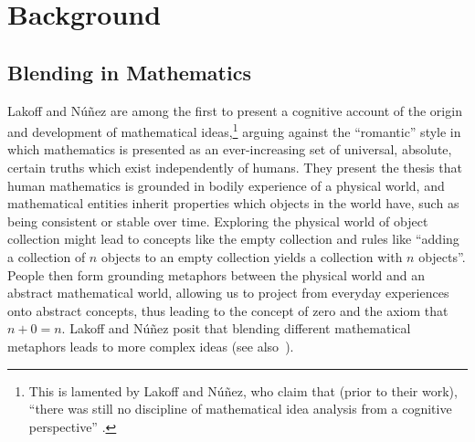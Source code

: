 \section{Background}
\label{sec:background}

\subsection{Blending in Mathematics}
\label{subsec:mathblend}


Lakoff and N{\'u}{\~n}ez \citep{Lak00} are among the first to present
a cognitive account of the origin and development of mathematical
ideas,\footnote{This is lamented by Lakoff and N{\'u}{\~n}ez, who
claim that (prior to their work), ``there was still no discipline of
mathematical idea analysis from a cognitive perspective''
\citep{Lak00}.} arguing against the ``romantic'' style in which
mathematics is presented as an ever-increasing set of universal,
absolute, certain truths which exist independently of humans. They
present the thesis that human mathematics is grounded in bodily
experience of a physical world, and mathematical entities inherit
properties which objects in the world have, such as being consistent
or stable over time.  Exploring the physical world of object
collection might lead to concepts like the empty collection and rules
like ``adding a collection of $n$ objects to an empty collection
yields a collection with $n$ objects''. People then form grounding
metaphors between the physical world and an abstract mathematical
world, allowing us to project from everyday experiences onto abstract
concepts, thus leading to the concept of zero and the axiom that $n +
0 = n$. Lakoff and N{\'u}{\~n}ez posit that blending different
mathematical metaphors leads to more complex ideas (see
also~\cite{Al11i}). 



